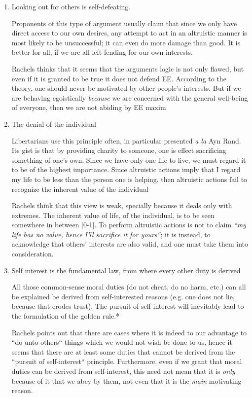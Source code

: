 \documentclass[english,course]{Notes}
\newcommand{\ita}[1]{\textit{#1}}
\begin{document}
\begin{enumerate}

    \item Looking out for others is self-defeating. 
        \par{Proponents of this type of argument usually claim that since we only have direct access to our own desires, any attempt to act in an altruistic manner is most likely to be unsuccessful; it can even do more damage than good. It is better for all, if we are all left fending for our own interests.}
        \par{Rachels thinks that it seems that the arguments logic is not only flawed, but even if it is granted to be true it does not defend EE. According to the theory, one should never be motivated by other people's interests. But if we are behaving egoistically \ita{because} we are concerned with the general well-being of everyone, then we are not abiding by EE maxim}
        
    \item The denial of the individual
        \par{Libertarians use this principle often, in particular presented \ita{a la} Ayn Rand. Its gist is that by providing charity to someone, one is effect sacrificing something of one's own. Since we have only one life to live, we must regard it to be of the highest importance. Since altruistic actions imply that I regard my life to be less than the person one is helping, then altruistic actions fail to recognize the inherent value of the individual}
        \par{Rachels think that this view is weak, specially because it deals only with extremes. The inherent value of life, of the individual, is to be seen somewhere in between [0-1]. To perform altruistic actions is not to claim \ita{``my life has no value, hence I'll sacrifice it for yours``}; it is instead, to acknowledge that others' interests are also valid, and one must take them into consideration.}
        
    \item Self interest is the fundamental law, from where every other duty is derived
        \par{All those common-sense moral duties (do not cheat, do no harm, etc.) can all be explained be derived from self-interested reasons (e.g. one does not lie, because that erodes trust). The pursuit of self-interest will inevitably lead to the formulation of the golden rule.*~}
        \par{Rachels points out that there are cases where it is indeed to our advantage to ``do unto others`` things which we would not wish be done to us, hence it seems that there are at least some duties that cannot be derived from the ``pursuit of self-interest`` principle. Furthermore, even if we grant that moral duties can be derived from self-interest, this need not mean that it is \ita{only} because of it that we abey by them, not even that it is the \ita{main} motivating reason.}  
\end{enumerate}
\end{document}
